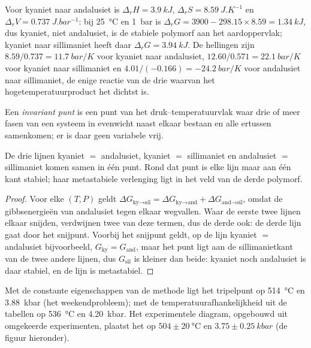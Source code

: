 Voor kyaniet naar andalusiet is $\Delta_r H = \qty{3.9}{kJ}$, $\Delta_r S =
\qty{8.59}{J.K^{-1}}$ en $\Delta_r V = \qty{0.737}{J.bar^{-1}}$: bij \qty{25}{\celsius}
en \qty{1}{bar} is $\Delta_r G = 3900 - 298.15\times8.59 = \qty{+1.34}{kJ}$, dus kyaniet,
niet andalusiet, is de stabiele polymorf aan het aardoppervlak; kyaniet naar sillimaniet heeft
daar $\Delta_r G = \qty{+3.94}{kJ}$. De hellingen zijn $8.59/0.737 = \qty{11.7}{bar/K}$ voor
kyaniet naar andalusiet, $12.60/0.571 = \qty{22.1}{bar/K}$ voor kyaniet naar sillimaniet en
$4.01/(-0.166) = \qty{-24.2}{bar/K}$ voor andalusiet naar sillimaniet, de enige reactie van
de drie waarvan het hogetemperatuurproduct het dichtst is.

\begin{definition}\label{def:b2:metamorphic-facies:invariant}
Een \emph{invariant punt} is een punt van het
druk--temperatuurvlak waar drie of meer fasen van een systeem in
evenwicht naast elkaar bestaan en alle  ertussen samenkomen; er is daar geen variabele vrij.
\end{definition}

\begin{proposition}\label{prop:b2:metamorphic-facies:triple}
De drie lijnen kyaniet $=$ andalusiet, kyaniet $=$ sillimaniet en andalusiet $=$
sillimaniet komen samen in één punt. Rond dat punt is elke lijn maar aan één kant stabiel; haar
metastabiele verlenging ligt in het veld van de derde polymorf.
\end{proposition}

\begin{proof}
Voor elke $(T, P)$ geldt $\Delta G_{\text{ky}\to\text{sil}} = \Delta G_{\text{ky}\to\text{and}} +
\Delta G_{\text{and}\to\text{sil}}$, omdat de gibbsenergieën van andalusiet tegen elkaar wegvallen. Waar
de eerste twee lijnen elkaar snijden, verdwijnen twee van deze termen, dus de derde ook: de derde
lijn gaat door het snijpunt. Voorbij het snijpunt geldt, op de lijn kyaniet $=$ andalusiet
bijvoorbeeld, $G_{\text{ky}} = G_{\text{and}}$, maar het punt ligt aan de sillimanietkant van de
twee andere lijnen, dus $G_{\text{sil}}$ is kleiner dan beide: kyaniet noch andalusiet
is daar stabiel, en de lijn is metastabiel.
\end{proof}

Met de constante eigenschappen van de methode ligt het tripelpunt op
\qty{514}{\celsius} en \qty{3.88}{kbar} (het weekendprobleem); met de
temperatuurafhankelijkheid uit de tabellen op \qty{536}{\celsius} en \qty{4.20}{kbar}. Het experimentele
diagram, opgebouwd uit omgekeerde experimenten, plaatst het op $504 \pm \qty{20}{\celsius}$ en
$3.75 \pm \qty{0.25}{kbar}$ (de figuur hieronder).

